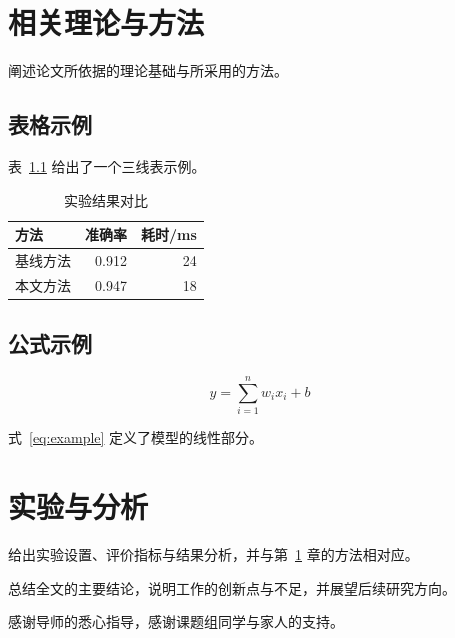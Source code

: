 \documentclass[type=master,fontset=fandol,newtxmath=false]{hithesis}
\begin{document}
\chapter{相关理论与方法}
\label{chap:method}
阐述论文所依据的理论基础与所采用的方法。

\section{表格示例}
表~\ref{tab:example} 给出了一个三线表示例。

\begin{table}[htbp]
  \centering
  \caption{实验结果对比}
  \label{tab:example}
  \begin{tabular}{lrr}
    \hline
    方法 & 准确率 & 耗时/ms \\
    \hline
    基线方法 & 0.912 & 24 \\
    本文方法 & 0.947 & 18 \\
    \hline
  \end{tabular}
\end{table}

\section{公式示例}
\begin{equation}
  \label{eq:example}
  y = \sum_{i=1}^{n} w_i x_i + b
\end{equation}

式~\eqref{eq:example} 定义了模型的线性部分。

\chapter{实验与分析}
\label{chap:exp}
给出实验设置、评价指标与结果分析，并与第~\ref{chap:method} 章的方法相对应。

\begin{conclusions}
  总结全文的主要结论，说明工作的创新点与不足，并展望后续研究方向。
\end{conclusions}

\begin{acknowledgements}
  感谢导师的悉心指导，感谢课题组同学与家人的支持。
\end{acknowledgements}
\end{document}
